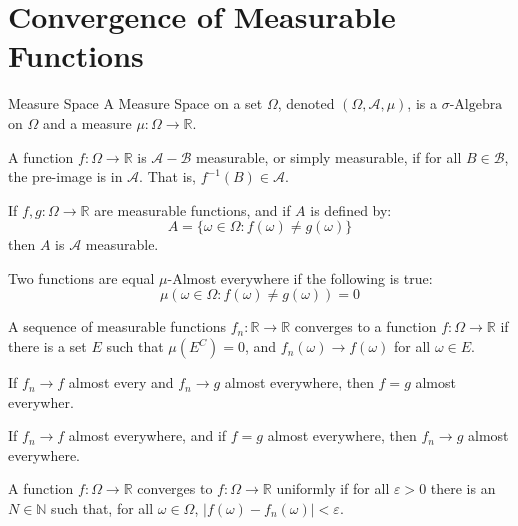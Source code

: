 \section{Convergence of Measurable Functions}
    \begin{ldefinition}{Measure Space}
        A Measure Space on a set $\Omega$, denoted
        $(\Omega,\mathcal{A},\mu)$, is a
        $\sigma\textrm{-Algebra}$ on $\Omega$ and a
        measure $\mu:\Omega\rightarrow\mathbb{R}$.
    \end{ldefinition}
    A function $f:\Omega\rightarrow\mathbb{R}$ is
    $\mathcal{A}-\mathcal{B}$ measurable, or simply
    measurable, if for all $B\in\mathcal{B}$, the
    pre-image is in $\mathcal{A}$. That is,
    $f^{-1}(B)\in\mathcal{A}$.
    \begin{theorem}
        If $f,g:\Omega\rightarrow\mathbb{R}$ are
        measurable functions, and if $A$ is defined by:
        \begin{equation}
            A=\{\omega\in\Omega:f(\omega)\ne{g}(\omega)\}
        \end{equation}
        then $A$ is $\mathcal{A}$ measurable.
    \end{theorem}
    \begin{definition}
        Two functions are equal $\mu$-Almost everywhere
        if the following is true:
        \begin{equation}
            \mu(\omega\in\Omega:f(\omega)\ne{g}(\omega))=0
        \end{equation}
    \end{definition}
    \begin{definition}
        A sequence of measurable functions
        $f_{n}:\mathbb{R}\rightarrow\mathbb{R}$ converges
        to a function $f:\Omega\rightarrow\mathbb{R}$
        if there is a set $E$ such that $\mu(E^{C})=0$,
        and $f_{n}(\omega)\rightarrow{f}(\omega)$ for all
        $\omega\in{E}$.
    \end{definition}
    \begin{theorem}
        If $f_{n}\rightarrow{f}$ almost every and
        $f_{n}\rightarrow{g}$ almost everywhere, then
        $f=g$ almost everywher.
    \end{theorem}
    \begin{theorem}
        If $f_{n}\rightarrow{f}$ almost everywhere, and
        if $f=g$ almost everywhere, then
        $f_{n}\rightarrow{g}$ almost everywhere.
    \end{theorem}
    \begin{definition}
        A function $f:\Omega\rightarrow\mathbb{R}$
        converges to $f:\Omega\rightarrow\mathbb{R}$
        uniformly if for all $\varepsilon>0$ there is
        an $N\in\mathbb{N}$ such that, for all
        $\omega\in\Omega$,
        $|f(\omega)-f_{n}(\omega)|<\varepsilon$.
    \end{definition}

